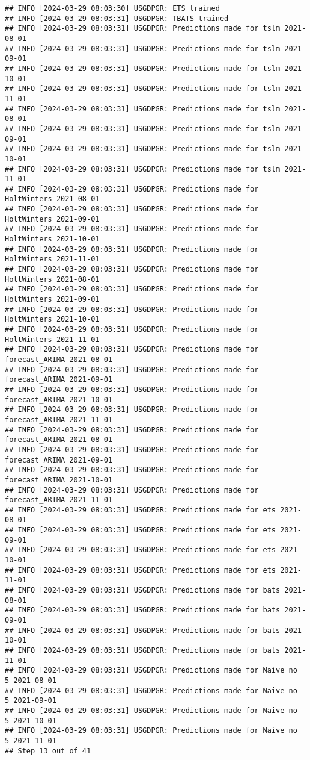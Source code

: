 \documentclass[
]{article}
\begin{document}
\begin{verbatim}
## INFO [2024-03-29 08:03:30] USGDPGR: ETS trained
## INFO [2024-03-29 08:03:31] USGDPGR: TBATS trained
## INFO [2024-03-29 08:03:31] USGDPGR: Predictions made for tslm 2021-08-01
## INFO [2024-03-29 08:03:31] USGDPGR: Predictions made for tslm 2021-09-01
## INFO [2024-03-29 08:03:31] USGDPGR: Predictions made for tslm 2021-10-01
## INFO [2024-03-29 08:03:31] USGDPGR: Predictions made for tslm 2021-11-01
## INFO [2024-03-29 08:03:31] USGDPGR: Predictions made for tslm 2021-08-01
## INFO [2024-03-29 08:03:31] USGDPGR: Predictions made for tslm 2021-09-01
## INFO [2024-03-29 08:03:31] USGDPGR: Predictions made for tslm 2021-10-01
## INFO [2024-03-29 08:03:31] USGDPGR: Predictions made for tslm 2021-11-01
## INFO [2024-03-29 08:03:31] USGDPGR: Predictions made for HoltWinters 2021-08-01
## INFO [2024-03-29 08:03:31] USGDPGR: Predictions made for HoltWinters 2021-09-01
## INFO [2024-03-29 08:03:31] USGDPGR: Predictions made for HoltWinters 2021-10-01
## INFO [2024-03-29 08:03:31] USGDPGR: Predictions made for HoltWinters 2021-11-01
## INFO [2024-03-29 08:03:31] USGDPGR: Predictions made for HoltWinters 2021-08-01
## INFO [2024-03-29 08:03:31] USGDPGR: Predictions made for HoltWinters 2021-09-01
## INFO [2024-03-29 08:03:31] USGDPGR: Predictions made for HoltWinters 2021-10-01
## INFO [2024-03-29 08:03:31] USGDPGR: Predictions made for HoltWinters 2021-11-01
## INFO [2024-03-29 08:03:31] USGDPGR: Predictions made for forecast_ARIMA 2021-08-01
## INFO [2024-03-29 08:03:31] USGDPGR: Predictions made for forecast_ARIMA 2021-09-01
## INFO [2024-03-29 08:03:31] USGDPGR: Predictions made for forecast_ARIMA 2021-10-01
## INFO [2024-03-29 08:03:31] USGDPGR: Predictions made for forecast_ARIMA 2021-11-01
## INFO [2024-03-29 08:03:31] USGDPGR: Predictions made for forecast_ARIMA 2021-08-01
## INFO [2024-03-29 08:03:31] USGDPGR: Predictions made for forecast_ARIMA 2021-09-01
## INFO [2024-03-29 08:03:31] USGDPGR: Predictions made for forecast_ARIMA 2021-10-01
## INFO [2024-03-29 08:03:31] USGDPGR: Predictions made for forecast_ARIMA 2021-11-01
## INFO [2024-03-29 08:03:31] USGDPGR: Predictions made for ets 2021-08-01
## INFO [2024-03-29 08:03:31] USGDPGR: Predictions made for ets 2021-09-01
## INFO [2024-03-29 08:03:31] USGDPGR: Predictions made for ets 2021-10-01
## INFO [2024-03-29 08:03:31] USGDPGR: Predictions made for ets 2021-11-01
## INFO [2024-03-29 08:03:31] USGDPGR: Predictions made for bats 2021-08-01
## INFO [2024-03-29 08:03:31] USGDPGR: Predictions made for bats 2021-09-01
## INFO [2024-03-29 08:03:31] USGDPGR: Predictions made for bats 2021-10-01
## INFO [2024-03-29 08:03:31] USGDPGR: Predictions made for bats 2021-11-01
## INFO [2024-03-29 08:03:31] USGDPGR: Predictions made for Naive no  5 2021-08-01
## INFO [2024-03-29 08:03:31] USGDPGR: Predictions made for Naive no  5 2021-09-01
## INFO [2024-03-29 08:03:31] USGDPGR: Predictions made for Naive no  5 2021-10-01
## INFO [2024-03-29 08:03:31] USGDPGR: Predictions made for Naive no  5 2021-11-01
## Step 13 out of 41
\end{verbatim}
\end{document}
